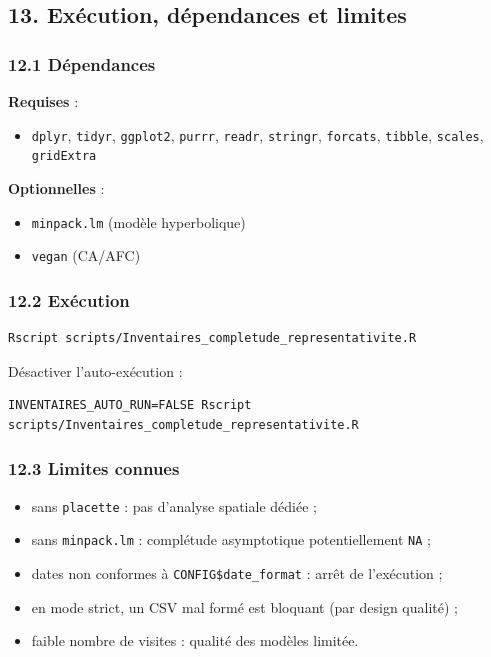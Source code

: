 \subsection{13. Exécution, dépendances et
limites}\label{exuxe9cution-duxe9pendances-et-limites}

\subsubsection{12.1 Dépendances}\label{duxe9pendances}

\textbf{Requises} :

\begin{itemize}
\tightlist
\item
  \texttt{dplyr}, \texttt{tidyr}, \texttt{ggplot2}, \texttt{purrr},
  \texttt{readr}, \texttt{stringr}, \texttt{forcats}, \texttt{tibble},
  \texttt{scales}, \texttt{gridExtra}
\end{itemize}

\textbf{Optionnelles} :

\begin{itemize}
\tightlist
\item
  \texttt{minpack.lm} (modèle hyperbolique)
\item
  \texttt{vegan} (CA/AFC)
\end{itemize}

\subsubsection{12.2 Exécution}\label{exuxe9cution}

\begin{verbatim}
Rscript scripts/Inventaires_completude_representativite.R
\end{verbatim}

Désactiver l'auto-exécution :

\begin{verbatim}
INVENTAIRES_AUTO_RUN=FALSE Rscript scripts/Inventaires_completude_representativite.R
\end{verbatim}

\subsubsection{12.3 Limites connues}\label{limites-connues}

\begin{itemize}
\tightlist
\item
  sans \texttt{placette} : pas d'analyse spatiale dédiée ;
\item
  sans \texttt{minpack.lm} : complétude asymptotique potentiellement
  \texttt{NA} ;
\item
  dates non conformes à \texttt{CONFIG\$date\_format} : arrêt de
  l'exécution ;
\item
  en mode strict, un CSV mal formé est bloquant (par design qualité) ;
\item
  faible nombre de visites : qualité des modèles limitée.
\end{itemize}

